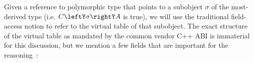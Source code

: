 
Given a reference  to polymorphic type  that points to a subobject 
$\sigma$ of the most-derived type  (i.e. $C\leftY\sigma\rightY A$ is 
true), we will use the traditional field-access notion  to refer to 
the virtual table of that subobject. The exact structure of the virtual table as 
mandated by the common vendor C++ ABI is immaterial for this discussion, but we 
mention a few fields that are important for the reasoning~\cite[.2]{C++ABI}:

